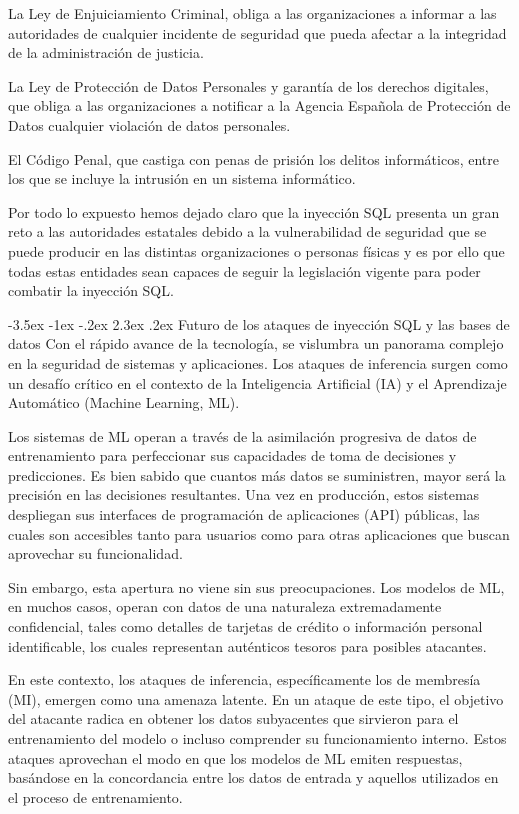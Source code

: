 \documentclass[11pt]{report}
\makeatletter
\renewcommand\chapter{\@startsection{chapter}{0}{\z@}%
    {-3.5ex \@plus -1ex \@minus -.2ex}%
    {2.3ex \@plus.2ex}%
    {\normalfont\Large\bfseries}}
\makeatother
\begin{document}
La Ley de Enjuiciamiento Criminal, obliga a las organizaciones a informar a las autoridades de cualquier incidente de seguridad que pueda afectar a la integridad
de la administración de justicia.

La Ley de Protección de Datos Personales y garantía de los derechos digitales, que obliga a las organizaciones a notificar a la Agencia Española de Protección de Datos cualquier violación
de datos personales.

El Código Penal, que castiga con penas de prisión los delitos informáticos, entre los que se incluye la intrusión en un sistema informático.

Por todo lo expuesto hemos dejado claro que la inyección SQL presenta un gran reto a las autoridades estatales debido a la vulnerabilidad de seguridad que se puede producir en
las distintas organizaciones o personas físicas y es por ello que todas estas entidades sean capaces de seguir la legislación vigente para poder combatir la inyección SQL.

\cleardoublepage

\chapter{Futuro de los ataques de inyección SQL y las bases de datos}
Con el rápido avance de la tecnología, se vislumbra un panorama complejo en la seguridad de sistemas y aplicaciones. Los ataques de inferencia surgen 
como un desafío crítico en el contexto de la Inteligencia Artificial (IA) y el Aprendizaje Automático (Machine Learning, ML).

Los sistemas de ML operan a través de la asimilación progresiva de datos de entrenamiento para perfeccionar sus capacidades de toma de decisiones y 
predicciones. Es bien sabido que cuantos más datos se suministren, mayor será la precisión en las decisiones resultantes. Una vez en producción, 
estos sistemas despliegan sus interfaces de programación de aplicaciones (API) públicas, las cuales son accesibles tanto para usuarios como para 
otras aplicaciones que buscan aprovechar su funcionalidad.
	
Sin embargo, esta apertura no viene sin sus preocupaciones. Los modelos de ML, en muchos casos, operan con datos de una naturaleza extremadamente
confidencial, tales como detalles de tarjetas de crédito o información personal identificable, los cuales representan auténticos tesoros para 
posibles atacantes.

En este contexto, los ataques de inferencia, específicamente los de membresía (MI), emergen como una amenaza latente. En un ataque de este tipo,
el objetivo del atacante radica en obtener los datos subyacentes que sirvieron para el entrenamiento del modelo o incluso comprender su funcionamiento
interno. Estos ataques aprovechan el modo en que los modelos de ML emiten respuestas, basándose en la concordancia entre los datos de entrada y aquellos
utilizados en el proceso de entrenamiento.
\end{document}

